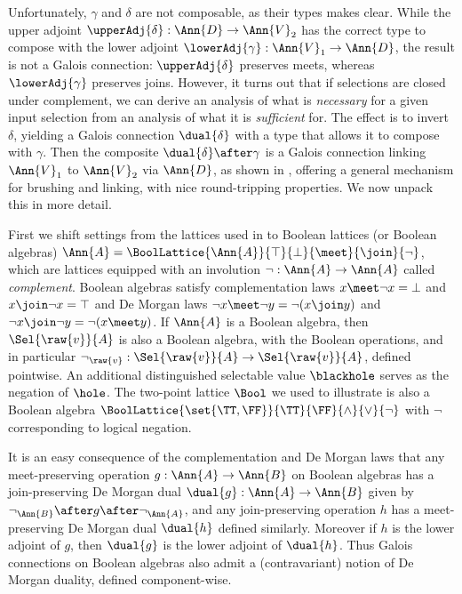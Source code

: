 
\vspace{-1mm}

\noindent Unfortunately, $\gamma$ and $\delta$ are not composable, as their types makes clear. While the upper adjoint $\upperAdj{\delta}: \Ann{D} \to \Ann{V}_2$ has the correct type to compose with the lower adjoint $\lowerAdj{\gamma}: \Ann{V}_1 \to \Ann{D}$, the result is not a Galois connection: $\upperAdj{\delta}$ preserves meets, whereas $\lowerAdj{\gamma}$ preserves joins. However, it turns out that if selections are closed under complement, we can derive an analysis of what is \emph{necessary} for a given input selection from an analysis of what it is \emph{sufficient} for. The effect is to invert $\delta$, yielding a Galois connection $\dual{\delta}$ with a type that allows it to compose with $\gamma$. Then the composite $\dual{\delta} \after \gamma$ is a Galois connection linking $\Ann{V}_1$ to $\Ann{V}_2$ via $\Ann{D}$, as shown in , offering a general mechanism for brushing and linking, with nice round-tripping properties. We now unpack this in more detail.

First we shift settings from the lattices used in  to Boolean lattices (or Boolean algebras) $\Ann{A}= \BoolLattice{\Ann{A}}{\top}{\bot}{\meet}{\join}{\neg}$, which are lattices equipped with an involution $\neg: \Ann{A} \to \Ann{A}$ called \emph{complement}. Boolean algebras satisfy complementation laws $x \meet \neg x = \bot$ and $x \join \neg x = \top$ and De Morgan laws $\neg x \meet \neg y = \neg(x \join y)$ and $\neg x \join \neg y = \neg(x \meet y)$. If $\Ann{A}$ is a Boolean algebra, then $\Sel{\raw{v}}{A}$ is also a Boolean algebra, with the Boolean operations, and in particular $\neg_{\raw{v}}: \Sel{\raw{v}}{A} \to \Sel{\raw{v}}{A}$, defined pointwise. An additional distinguished selectable value $\blackhole$ serves as the negation of $\hole$. The two-point lattice $\Bool$ we used to illustrate  is also a Boolean algebra $\BoolLattice{\set{\TT,\FF}}{\TT}{\FF}{\wedge}{\vee}{\neg}$ with $\neg$ corresponding to logical negation.



It is an easy consequence of the complementation and De Morgan laws that any meet-preserving operation $g: \Ann{A} \to \Ann{B}$ on Boolean algebras has a join-preserving De Morgan dual $\dual{g}: \Ann{A} \to \Ann{B}$ given by $\neg_{\Ann{B}} \after g\after \neg_{\Ann{A}}$, and any join-preserving operation $h$ has a meet-preserving De Morgan dual $\dual{h}$ defined similarly. Moreover if $h$ is the lower adjoint of $g$, then $\dual{g}$ is the lower adjoint of $\dual{h}$. Thus Galois connections on Boolean algebras also admit a (contravariant) notion of De Morgan duality, defined component-wise.

